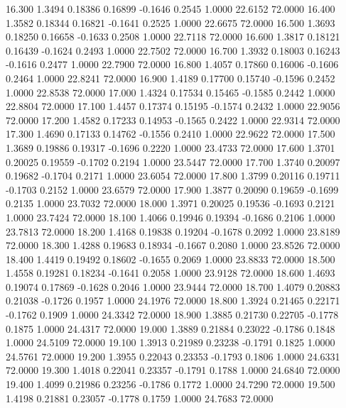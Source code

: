   16.300   1.3494   0.18386   0.16899  -0.1646   0.2545   1.0000  22.6152  72.0000
  16.400   1.3582   0.18344   0.16821  -0.1641   0.2525   1.0000  22.6675  72.0000
  16.500   1.3693   0.18250   0.16658  -0.1633   0.2508   1.0000  22.7118  72.0000
  16.600   1.3817   0.18121   0.16439  -0.1624   0.2493   1.0000  22.7502  72.0000
  16.700   1.3932   0.18003   0.16243  -0.1616   0.2477   1.0000  22.7900  72.0000
  16.800   1.4057   0.17860   0.16006  -0.1606   0.2464   1.0000  22.8241  72.0000
  16.900   1.4189   0.17700   0.15740  -0.1596   0.2452   1.0000  22.8538  72.0000
  17.000   1.4324   0.17534   0.15465  -0.1585   0.2442   1.0000  22.8804  72.0000
  17.100   1.4457   0.17374   0.15195  -0.1574   0.2432   1.0000  22.9056  72.0000
  17.200   1.4582   0.17233   0.14953  -0.1565   0.2422   1.0000  22.9314  72.0000
  17.300   1.4690   0.17133   0.14762  -0.1556   0.2410   1.0000  22.9622  72.0000
  17.500   1.3689   0.19886   0.19317  -0.1696   0.2220   1.0000  23.4733  72.0000
  17.600   1.3701   0.20025   0.19559  -0.1702   0.2194   1.0000  23.5447  72.0000
  17.700   1.3740   0.20097   0.19682  -0.1704   0.2171   1.0000  23.6054  72.0000
  17.800   1.3799   0.20116   0.19711  -0.1703   0.2152   1.0000  23.6579  72.0000
  17.900   1.3877   0.20090   0.19659  -0.1699   0.2135   1.0000  23.7032  72.0000
  18.000   1.3971   0.20025   0.19536  -0.1693   0.2121   1.0000  23.7424  72.0000
  18.100   1.4066   0.19946   0.19394  -0.1686   0.2106   1.0000  23.7813  72.0000
  18.200   1.4168   0.19838   0.19204  -0.1678   0.2092   1.0000  23.8189  72.0000
  18.300   1.4288   0.19683   0.18934  -0.1667   0.2080   1.0000  23.8526  72.0000
  18.400   1.4419   0.19492   0.18602  -0.1655   0.2069   1.0000  23.8833  72.0000
  18.500   1.4558   0.19281   0.18234  -0.1641   0.2058   1.0000  23.9128  72.0000
  18.600   1.4693   0.19074   0.17869  -0.1628   0.2046   1.0000  23.9444  72.0000
  18.700   1.4079   0.20883   0.21038  -0.1726   0.1957   1.0000  24.1976  72.0000
  18.800   1.3924   0.21465   0.22171  -0.1762   0.1909   1.0000  24.3342  72.0000
  18.900   1.3885   0.21730   0.22705  -0.1778   0.1875   1.0000  24.4317  72.0000
  19.000   1.3889   0.21884   0.23022  -0.1786   0.1848   1.0000  24.5109  72.0000
  19.100   1.3913   0.21989   0.23238  -0.1791   0.1825   1.0000  24.5761  72.0000
  19.200   1.3955   0.22043   0.23353  -0.1793   0.1806   1.0000  24.6331  72.0000
  19.300   1.4018   0.22041   0.23357  -0.1791   0.1788   1.0000  24.6840  72.0000
  19.400   1.4099   0.21986   0.23256  -0.1786   0.1772   1.0000  24.7290  72.0000
  19.500   1.4198   0.21881   0.23057  -0.1778   0.1759   1.0000  24.7683  72.0000

